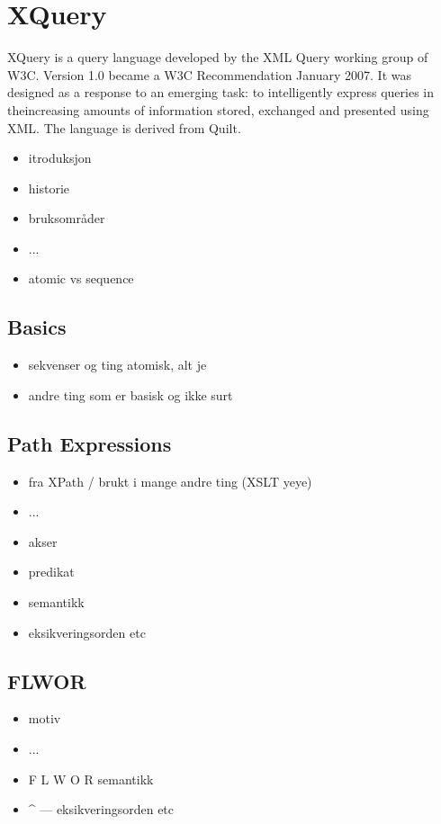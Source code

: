 \section{XQuery}

XQuery is a query language developed by the XML Query working group of W3C.
Version 1.0\cite{w3c00} became a W3C Recommendation January 2007. It was designed as a
response to an emerging task: to intelligently express queries in theincreasing
amounts of information stored, exchanged and presented using XML. The language
is derived from Quilt\cite{quilt_queryLanguage}.


\begin{itemize}
\item itroduksjon
\item historie
\item bruksomr\aa der
\item ...
\item atomic vs sequence
\end{itemize}

\subsection{Basics}
\begin{itemize}
  \item sekvenser og ting atomisk, alt je
  \item andre ting som er basisk og ikke surt
\end{itemize}

\subsection{Path Expressions}
\begin{itemize}
\item fra XPath / brukt i mange andre ting (XSLT yeye)
\item ...
\item akser
\item predikat
\item semantikk 
\item eksikveringsorden etc
\end{itemize}

\subsection{FLWOR}

\begin{itemize}
\item motiv
\item ...
\item F L W O R semantikk
\item \^{} --- eksikveringsorden etc
\end{itemize}

